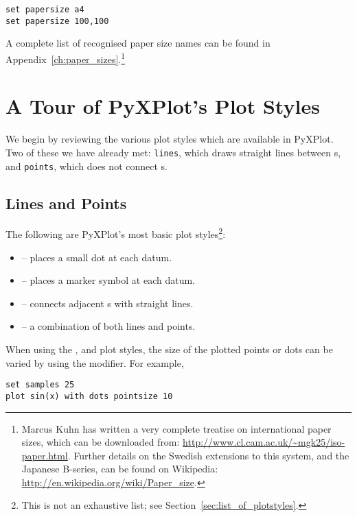 \begin{verbatim}
set papersize a4
set papersize 100,100
\end{verbatim}

\noindent A complete list of recognised paper size names can be found in
Appendix~\ref{ch:paper_sizes}.\footnote{Marcus Kuhn has written a very complete
treatise on international paper sizes, which can be downloaded from:
\url{http://www.cl.cam.ac.uk/~mgk25/iso-paper.html}. Further details on the
Swedish extensions to this system, and the Japanese B-series, can be found on
Wikipedia: \url{http://en.wikipedia.org/wiki/Paper_size}.}

\section{A Tour of PyXPlot's Plot Styles}

We begin by reviewing the various plot styles which are available in PyXPlot.
Two of these we have already met: {\tt lines}, which draws straight lines
between \datapoint s, and {\tt points}, which does not connect \datapoint s.

\subsection{Lines and Points}

The following are PyXPlot's most basic plot styles\footnote{This is not an
exhaustive list; see Section~\ref{sec:list_of_plotstyles}.}:
\begin{itemize}
\item {} -- places a small dot at each datum.
\item {} -- places a marker symbol at each datum.
\item {} -- connects adjacent \datapoint s with straight lines.
\item {} -- a combination of both lines and points.
\end{itemize}

When using the ,  and  plot
styles, the size of the plotted points or dots can be varied by using the
 modifier. For example,

\begin{verbatim}
set samples 25
plot sin(x) with dots pointsize 10
\end{verbatim}


